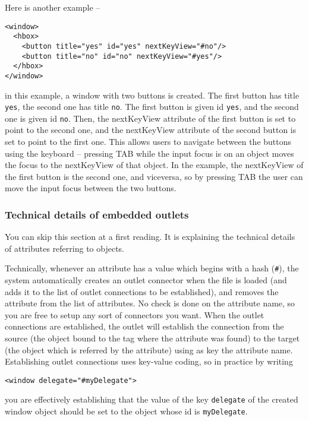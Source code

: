 \begin{enumerate}
\end{enumerate}

Here is another example --
\begin{verbatim}
<window>
  <hbox>
    <button title="yes" id="yes" nextKeyView="#no"/>
    <button title="no" id="no" nextKeyView="#yes"/>
  </hbox>
</window>
\end{verbatim}
in this example, a window with two buttons is created.  The first
button has title \texttt{yes}, the second one has title \texttt{no}.
The first button is given id \texttt{yes}, and the second one is given
id \texttt{no}.  Then, the nextKeyView attribute of the first button
is set to point to the second one, and the nextKeyView attribute of
the second button is set to point to the first one.  This allows users
to navigate between the buttons using the keyboard -- pressing TAB
while the input focus is on an object moves the focus to the
nextKeyView of that object.  In the example, the nextKeyView of the
first button is the second one, and viceversa, so by pressing TAB the
user can move the input focus between the two buttons.

\subsubsection{Technical details of embedded outlets}
You can skip this section at a first reading.  It is explaining the
technical details of attributes referring to objects.

Technically, whenever an attribute has a value which begins with a
hash (\texttt{\#}), the system automatically creates an outlet
connector when the file is loaded (and adds it to the list of outlet
connections to be established), and removes the attribute from the
list of attributes.  No check is done on the attribute name, so you
are free to setup any sort of connectors you want.  When the outlet
connections are established, the outlet will establish the connection
from the source (the object bound to the tag where the attribute was
found) to the target (the object which is referred by the attribute)
using as key the attribute name.  Establishing outlet connections uses
key-value coding, so in practice by writing
\begin{verbatim}
<window delegate="#myDelegate">
\end{verbatim}
you are effectively establishing that the value of the key
\texttt{delegate} of the created window object should be set to the
object whose id is \texttt{myDelegate}.


